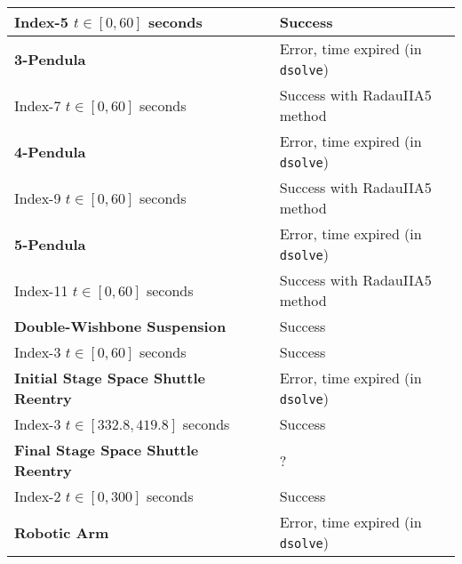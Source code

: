{\begin{longtable}{lccl}
    Index-5 \quad $t \in [0, 60]$ seconds & \Indigo{} & \mycheckmark{}\phantom{\mywarnmark{}} & Success \\ \midrule
  \multirow{1}{*}{\textbf{3-Pendula~\cite{nedialkov2008solvingIII}}}
    & \Maple{}  & \mycrossmark{}\phantom{\mywarnmark{}} & Error, time expired (in \texttt{dsolve}) \\ \cmidrule(l{4pt}){2-4}
    Index-7 \quad $t \in [0, 60]$ seconds & \Indigo{} & \mycheckmark{}\mywarnmark{} & Success with RadauIIA5 method \\ \midrule
  \multirow{1}{*}{\textbf{4-Pendula~\cite{nedialkov2008solvingIII}}}
      & \Maple{}  & \mycrossmark{}\phantom{\mywarnmark{}} & Error, time expired (in \texttt{dsolve}) \\ \cmidrule(l{4pt}){2-4}
      Index-9 \quad $t \in [0, 60]$ seconds & \Indigo{} & \mycheckmark{}\mywarnmark{} & Success with RadauIIA5 method \\ \midrule
  \multirow{1}{*}{\textbf{5-Pendula~\cite{nedialkov2008solvingIII}}}
      & \Maple{}  & \mycrossmark{}\phantom{\mywarnmark{}} & Error, time expired (in \texttt{dsolve}) \\ \cmidrule(l{4pt}){2-4}
      Index-11 \quad $t \in [0, 60]$ seconds & \Indigo{} & \mycheckmark{}\mywarnmark{} & Success with RadauIIA5 method \\ \midrule
  \multirow{1}{*}{\textbf{Double-Wishbone Suspension}}
    & \Maple{}  & \mycheckmark{}\phantom{\mywarnmark{}} & Success \\ \cmidrule(l{4pt}){2-4}
    Index-3 \quad $t \in [0, 60]$ seconds & \Indigo{} & \mycheckmark{}\phantom{\mywarnmark{}} & Success \\ \midrule
  \multirow{1}{*}{\textbf{Initial Stage Space Shuttle Reentry~\cite{brenan1995numerical}}}
    & \Maple{}  & \mycrossmark{}\phantom{\mywarnmark{}} & Error, time expired (in \texttt{dsolve}) \\ \cmidrule(l{4pt}){2-4}
    Index-3 \quad $t \in [332.8, 419.8]$ seconds & \Indigo{} & \mycheckmark{}\phantom{\mywarnmark{}} & Success \\ \midrule
  \multirow{1}{*}{\textbf{Final Stage Space Shuttle Reentry~\cite{brenan1995numerical}}}
    & \Maple{}  & \mycrossmark{}\phantom{\mywarnmark{}} & ? \\ \cmidrule(l{4pt}){2-4}
    Index-2 \quad $t \in [0, 300]$ seconds & \Indigo{} & \mycheckmark{}\phantom{\mywarnmark{}} & Success \\ \midrule
  \multirow{1}{*}{\textbf{Robotic Arm~\cite{pryce1998solving}}}
    & \Maple{}  & \mycrossmark{}\phantom{\mywarnmark{}} & Error, time expired (in \texttt{dsolve}) \\ \cmidrule(l{4pt}){2-4}

\end{longtable}}
